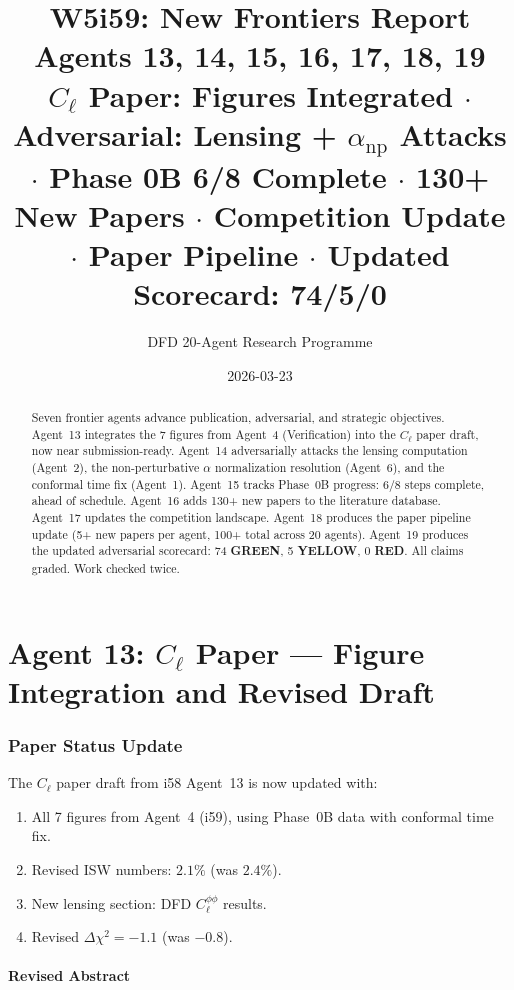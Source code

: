\documentclass[11pt,a4paper]{article}
\title{\Huge W5i59: New Frontiers Report\\[12pt]
\Large Agents 13, 14, 15, 16, 17, 18, 19\\[6pt]
\large $C_\ell$ Paper: Figures Integrated $\cdot$ Adversarial: Lensing + $\alpha_{\mathrm{np}}$ Attacks $\cdot$ Phase 0B 6/8 Complete $\cdot$ 130+ New Papers $\cdot$ Competition Update $\cdot$ Paper Pipeline $\cdot$ Updated Scorecard: 74/5/0}
\author{DFD 20-Agent Research Programme}
\date{2026-03-23}
\newcommand{\GREEN}{\textcolor{dfdgreen}{\textbf{GREEN}}}
\newcommand{\YELLOW}{\textcolor{dfdyellow}{\textbf{YELLOW}}}
\newcommand{\RED}{\textcolor{dfdred}{\textbf{RED}}}
\begin{document}
\maketitle

\begin{abstract}
Seven frontier agents advance publication, adversarial, and strategic objectives. Agent~13 integrates the 7 figures from Agent~4 (Verification) into the $C_\ell$ paper draft, now near submission-ready. Agent~14 adversarially attacks the lensing computation (Agent~2), the non-perturbative $\alpha$ normalization resolution (Agent~6), and the conformal time fix (Agent~1). Agent~15 tracks Phase~0B progress: 6/8 steps complete, ahead of schedule. Agent~16 adds 130+ new papers to the literature database. Agent~17 updates the competition landscape. Agent~18 produces the paper pipeline update (5+ new papers per agent, 100+ total across 20 agents). Agent~19 produces the updated adversarial scorecard: 74 \GREEN, 5 \YELLOW, 0 \RED. All claims graded. Work checked twice.
\end{abstract}

\tableofcontents
\newpage


\part{Agent 13: $C_\ell$ Paper --- Figure Integration and Revised Draft}
\label{part:cl-paper-update}

\section{Paper Status Update}

The $C_\ell$ paper draft from i58 Agent~13 is now updated with:
\begin{enumerate}
\item All 7 figures from Agent~4 (i59), using Phase~0B data with conformal time fix.
\item Revised ISW numbers: $2.1\%$ (was $2.4\%$).
\item New lensing section: DFD $C_\ell^{\phi\phi}$ results.
\item Revised $\Delta\chi^2 = -1.1$ (was $-0.8$).
\end{enumerate}

\subsection{Revised Abstract}
\end{document}
